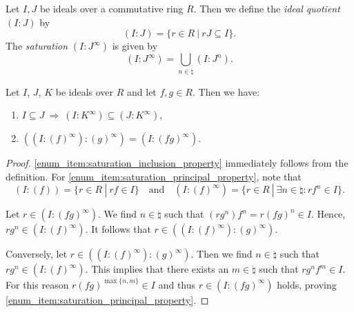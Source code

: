 \begin{defiApp}
	Let $I,J$ be ideals over a commutative ring $R$. Then we define the \emph{ideal quotient} $(I:J)$ by
	$$(I:J) = \{r\in R\ |\ rJ\subseteq I\}.$$
	The \emph{saturation} $(I:J^\infty)$ is given by
	$$(I:J^\infty) = \bigcup_{n\in \natural}(I:J^n).$$
\end{defiApp}

\begin{propApp}
	Let $I$, $J$, $K$ be ideals over $R$ and let $f,g\in R$. Then we have:
	\begin{enumerate}[label={\upshape(\roman*)}]
		\item $I\subseteq J\ \Rightarrow\ (I:K^\infty)\subseteq(J:K^\infty)$,
		\label{enum_item:saturation_inclusion_property}
		\item $((I:(f)^\infty):(g)^\infty) = (I:(fg)^\infty)$.
		\label{enum_item:saturation_principal_property}
	\end{enumerate}
\end{propApp}
\begin{proof}
	\ref{enum_item:saturation_inclusion_property} immediately follows from the definition. For \ref{enum_item:saturation_principal_property}, note that
	$$(I:(f)) = \{r\in R\ |\ rf\in I\}\quad\text{and}\quad (I:(f)^\infty) = \{r\in R\ |\ \exists n\in\natural: rf^n\in I\}.$$
	
	Let $r\in (I:(fg)^\infty)$. We find $n\in \natural$ such that $(rg^n)f^n = r(fg)^n\in I$. Hence, $rg^n\in (I:(f)^\infty)$. It follows that $r\in((I:(f)^\infty):(g)^\infty)$.
	
	Conversely, let $r\in((I:(f)^\infty):(g)^\infty)$. Then we find $n\in \natural$ such that $rg^n\in (I:(f)^\infty)$. This implies that there exists an $m\in\natural$ such that $rg^nf^m\in I$. For this reason $r(fg)^{\max\{n,m\}}\in I$ and thus $r\in (I:(fg)^\infty)$ holds, proving \ref{enum_item:saturation_principal_property}.
\end{proof}